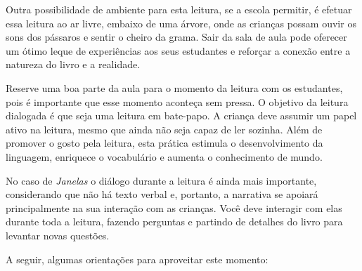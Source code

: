\documentclass[11pt]{extarticle}
\begin{document}
Outra possibilidade de ambiente para esta leitura, se a escola permitir, 
é efetuar essa leitura ao ar livre, embaixo de uma árvore, onde as crianças 
possam ouvir os sons dos pássaros e sentir o cheiro da grama. Sair da sala 
de aula pode oferecer um ótimo leque de experiências aos seus estudantes e 
reforçar a conexão entre a natureza do livro e a realidade.  

Reserve uma boa parte da aula para o momento da leitura com os estudantes, 
pois é importante que esse momento aconteça sem pressa. O objetivo da 
leitura dialogada é que seja uma leitura em bate-papo. A criança deve 
assumir um papel ativo na leitura, mesmo que ainda não seja capaz de 
ler sozinha. Além de promover o gosto pela leitura, esta prática estimula 
o desenvolvimento da linguagem, enriquece o vocabulário e 
aumenta o conhecimento de mundo.

No caso de \textit{Janelas} o diálogo durante a leitura é 
ainda mais importante, considerando que não há texto verbal e, 
portanto, a narrativa se apoiará principalmente na sua interação com as crianças. 
Você deve interagir com elas durante toda a 
leitura, fazendo perguntas e partindo de detalhes do livro para 
levantar novas questões.

A seguir, algumas orientações para aproveitar este momento: 
\end{document}
